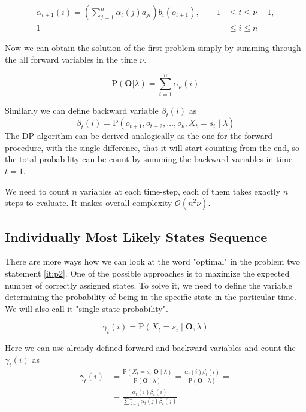 \documentclass[thesis=M,english]{FITthesis}[2012/10/20]
\newcommand{\matr}[1]{\mathbf{#1}}
\begin{document}
\begin{equation}
\begin{aligned}
\alpha_{t+1}(i) = \left( \sum_{j=1}^n \alpha_t(j) a_{ji} \right) b_i(o_{t+1}), \qquad 1& \leq t \leq \nu - 1, \\ 
                                                                                 1& \leq i \leq n		\end{aligned}
\end{equation}

Now we can obtain the solution of the first problem simply by summing through the all forward variables in the time $\nu$.

\begin{equation}
\mathrm{P}(\matr{O}|\lambda) = \sum_{i=1}^n \alpha_{\nu}(i)
\end{equation} 

Similarly we can define backward variable $\beta_t(i)$ as
\begin{equation}
\beta_t(i) = \mathrm{P}(o_{t+1},o_{t+2},\dots,o_{\nu},X_t = s_i \mid \lambda ) 
\end{equation}
The DP algorithm can be derived analogically as the one for the forward procedure, with the single difference, that it will start counting from the end, so the total probability can be count by summing the backward variables in time $t=1$.

We need to count $n$ variables at each time-step, each of them takes exactly $n$ steps to evaluate. It makes overall complexity $\mathcal{O}(n^2\nu)$.    

\subsection{Individually Most Likely States Sequence}\label{sec:ssp}
There are more ways how we can look at the word "optimal" in the problem two statement \ref{it:p2}. One of the possible approaches is to maximize the expected number of correctly assigned states. To solve it, we need to define the variable determining the probability of being in the specific state in the particular time. We will also call it "single state probability".

\begin{equation}
\gamma_t(i) = \mathrm{P}(X_t = s_i \mid \matr{O},\lambda ) 
\end{equation}

Here we can use already defined forward and backward variables and count the $\gamma_t(i)$ as
\begin{equation}
\begin{aligned}
\gamma_t(i) &= \frac{ \mathrm{P}( X_t = s_i, \matr{O} \mid \lambda )}{ \mathrm{P}( \matr{O} \mid \lambda )} =
               \frac{  \alpha_t(i) \beta_t(i) }{ \mathrm{P}( \matr{O} \mid \lambda )} = \\
            &= \frac{  \alpha_t(i) \beta_t(i) }{ \sum\limits_{j=1}^n \alpha_t(j) \beta_t(j) } 
\end{aligned}
\end{equation}
\end{document}
